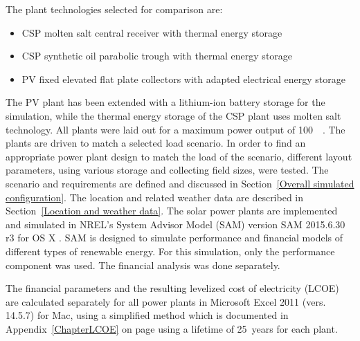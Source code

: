 The plant technologies selected for comparison are: 
\begin{itemize}
\item CSP molten salt central receiver with thermal energy storage
\item CSP synthetic oil parabolic trough with thermal energy storage
\item PV fixed elevated flat plate collectors with adapted electrical energy storage
\end{itemize}
The PV plant has been extended with a lithium-ion battery storage for the simulation, while the thermal energy storage of the CSP plant uses molten salt technology.
All plants were laid out for a maximum power output of \SI{100}{\mega\wattel}.
The plants are driven to match a selected load scenario.
In order to find an appropriate power plant design to match the load of the scenario, different layout parameters, using various storage and collecting field sizes, were tested.
The scenario and requirements are defined and discussed in Section~\ref{Overall simulated configuration}. The location and related weather data are described in Section~\ref{Location and weather data}.
The solar power plants are implemented and simulated in NREL’s System Advisor Model (SAM) version SAM 2015.6.30 r3 for OS X \cite{NREL2015}. 
SAM is designed to simulate performance and financial models of different types of renewable energy. For this simulation, only the performance component was used. The financial analysis was done separately. 

The financial parameters and the resulting levelized cost of electricity (LCOE) are calculated separately for all power plants in Microsoft Excel 2011 (vers. 14.5.7) for Mac, using a simplified method which is documented in Appendix~\ref{ChapterLCOE} on page \pageref{ChapterLCOE} using a lifetime of \SI{25}{years} for each plant.

